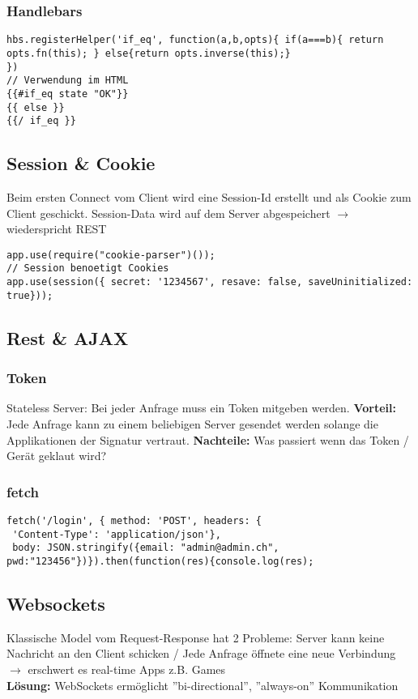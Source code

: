 \subsubsection{Handlebars}
\begin{lstlisting}
hbs.registerHelper('if_eq', function(a,b,opts){ if(a===b){ return opts.fn(this); } else{return opts.inverse(this);}
})
// Verwendung im HTML
{{#if_eq state "OK"}}
{{ else }}
{{/ if_eq }}
\end{lstlisting}



\subsection{Session \& Cookie}
Beim ersten Connect vom Client wird eine Session-Id erstellt und als Cookie zum Client geschickt. Session-Data wird auf dem Server abgespeichert $\rightarrow$ wiederspricht REST
\begin{lstlisting}
app.use(require("cookie-parser")());
// Session benoetigt Cookies
app.use(session({ secret: '1234567', resave: false, saveUninitialized: true}));
\end{lstlisting}



\subsection{Rest \& AJAX}
\subsubsection{Token}
Stateless Server: Bei jeder Anfrage muss ein Token mitgeben werden.
\textbf{Vorteil:} Jede Anfrage kann zu einem beliebigen Server gesendet werden solange die Applikationen der Signatur vertraut. \textbf{Nachteile:} Was passiert wenn das Token / Gerät geklaut wird?


\subsubsection{fetch}
\begin{lstlisting}
fetch('/login', { method: 'POST', headers: {
 'Content-Type': 'application/json'},
 body: JSON.stringify({email: "admin@admin.ch",
pwd:"123456"})}).then(function(res){console.log(res);
\end{lstlisting}


\subsection{Websockets}
Klassische Model vom Request-Response hat 2 Probleme:
Server kann keine Nachricht an den Client schicken /
Jede Anfrage öffnete eine neue Verbindung $\rightarrow$ erschwert es real-time Apps z.B. Games\\
\textbf{Lösung:} WebSockets ermöglicht ''bi-directional'', ''always-on'' Kommunikation


\columnbreak